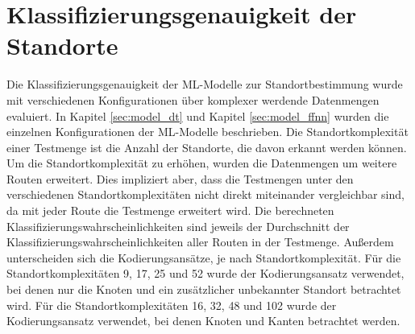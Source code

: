 \section{Klassifizierungsgenauigkeit der Standorte}
Die Klassifizierungsgenauigkeit der ML-Modelle zur Standortbestimmung wurde mit verschiedenen Konfigurationen über komplexer werdende Datenmengen evaluiert.
In Kapitel \ref{sec:model_dt} und Kapitel \ref{sec:model_ffnn} wurden die einzelnen Konfigurationen der ML-Modelle beschrieben.
Die Standortkomplexität einer Testmenge ist die Anzahl der Standorte, die davon erkannt werden können.
Um die Standortkomplexität zu erhöhen, wurden die Datenmengen um weitere Routen erweitert.
Dies impliziert aber, dass die Testmengen unter den verschiedenen Standortkomplexitäten nicht direkt miteinander vergleichbar sind, da mit jeder Route die Testmenge erweitert wird.
Die berechneten Klassifizierungswahrscheinlichkeiten sind jeweils der Durchschnitt der Klassifizierungswahrscheinlichkeiten aller Routen in der Testmenge.
\newline
\newline
Außerdem unterscheiden sich die Kodierungsansätze, je nach Standortkomplexität.
Für die Standortkomplexitäten 9, 17, 25 und 52 wurde der Kodierungsansatz verwendet, bei denen nur die Knoten und ein zusätzlicher unbekannter Standort betrachtet wird.
Für die Standortkomplexitäten 16, 32, 48 und 102 wurde der Kodierungsansatz verwendet, bei denen Knoten und Kanten betrachtet werden.

